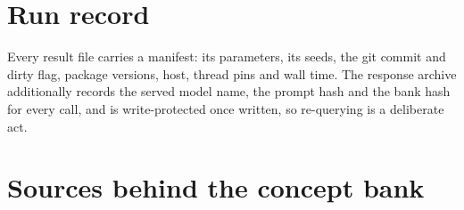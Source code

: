 \documentclass[11pt]{article}
\begin{document}
\section{Run record}

Every result file carries a manifest: its parameters, its seeds, the git commit and dirty flag,
package versions, host, thread pins and wall time. The response archive additionally records the
served model name, the prompt hash and the bank hash for every call, and is write-protected once
written, so re-querying is a deliberate act.

\appendix





\section{Sources behind the concept bank}
\nocite{*}


\end{document}
